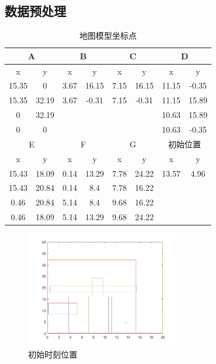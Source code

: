 \documentclass{article}
\begin{document}
	\subsection{数据预处理}
	\begin{table}[h]
		\centering
		\caption{地图模型坐标点}
		\begin{tabular}{|c|c|c|c|c|c|c|c|}
			\hline
			\multicolumn{2}{|c|}{A} & \multicolumn{2}{c|}{B} & \multicolumn{2}{c|}{C} & \multicolumn{2}{c|}{D}    \\ \hline
			x          & y          & x         & y          & x         & y          & x            & y          \\ \hline
			15.35      & 0          & 3.67      & 16.15      & 7.15      & 16.15      & 11.15        & -0.35      \\ \hline
			15.35      & 32.19      & 3.67      & -0.31      & 7.15      & -0.31      & 11.15        & 15.89      \\ \hline
			0          & 32.19      &           &            &           &            & 10.63        & 15.89      \\ \hline
			0          & 0          &           &            &           &            & 10.63        & -0.35      \\ \hline
			\multicolumn{2}{|c|}{E} & \multicolumn{2}{c|}{F} & \multicolumn{2}{c|}{G} & \multicolumn{2}{c|}{初始位置} \\ \hline
			x          & y          & x         & y          & x         & y          & x            & y          \\ \hline
			15.43      & 18.09      & 0.14      & 13.29      & 7.78      & 24.22      & 13.57        & 4.96       \\ \hline
			15.43      & 20.84      & 0.14      & 8.4        & 7.78      & 16.22      &              &            \\ \hline
			0.46       & 20.84      & 5.14      & 8.4        & 9.68      & 16.22      &              &            \\ \hline
			0.46       & 18.09      & 5.14      & 13.29      & 9.68      & 24.22      &              &            \\ \hline
		\end{tabular}
	\end{table}
	\begin{figure}[!h]
		\centering 
		\includegraphics[width=0.6\textwidth]{primitiveposition.png}	
		\caption{初始时刻位置}
	\end{figure}
\end{document}
